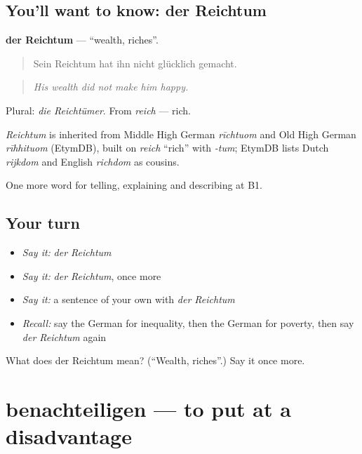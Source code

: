 \subsection*{You'll want to know: der Reichtum}
\textbf{der Reichtum} — \textquotedblleft{}wealth, riches\textquotedblright{}.

\begin{quote}
Sein Reichtum hat ihn nicht glücklich gemacht.
\end{quote}

\begin{quote}
\emph{His wealth did not make him happy.}
\end{quote}

Plural: \emph{die Reichtümer}. From \emph{reich} — rich.

\begin{cousinweb}
\emph{Reichtum} is inherited from Middle High German \emph{rīchtuom} and Old High German \emph{rīhhituom} (EtymDB), built on \emph{reich} \textquotedblleft{}rich\textquotedblright{} with \emph{-tum}; EtymDB lists Dutch \emph{rijkdom} and English \emph{richdom} as cousins.
\end{cousinweb}

\begin{grammarlens}[title={What you've built}]
One more word for telling, explaining and describing at B1.
\end{grammarlens}

\subsection*{Your turn}
\begin{itemize}
\raggedright
  \item \emph{Say it:} \emph{der Reichtum}
  \item \emph{Say it:} \emph{der Reichtum}, once more
  \item \emph{Say it:} a sentence of your own with \emph{der Reichtum}
  \item \emph{Recall:} say the German for inequality, then the German for poverty, then say \emph{der Reichtum} again
\end{itemize}

\begin{tcolorbox}[breakable,colback=teal!4,colframe=teal!35!black,title={Before you move on}]
What does der Reichtum mean? (\textquotedblleft{}Wealth, riches\textquotedblright{}.) Say it once more.
\end{tcolorbox}
\section[benachteiligen]{benachteiligen — to put at a disadvantage}

